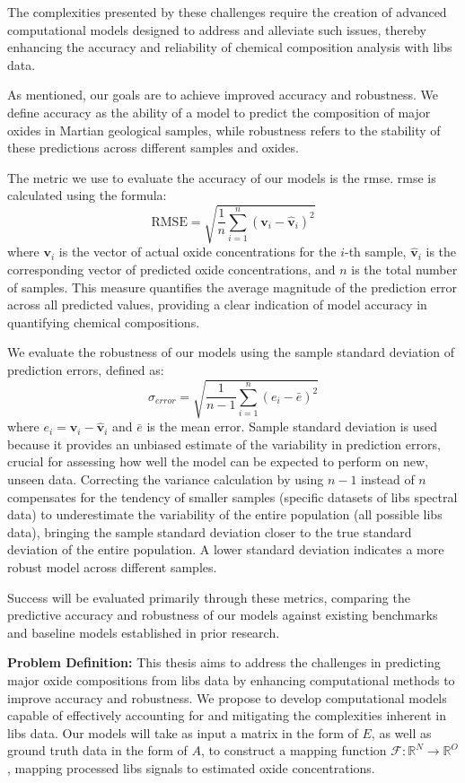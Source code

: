 The complexities presented by these challenges require the creation of advanced computational models designed to address and alleviate such issues, thereby enhancing the accuracy and reliability of chemical composition analysis with \gls{libs} data.

As mentioned, our goals are to achieve improved accuracy and robustness.
We define accuracy as the ability of a model to predict the composition of major oxides in Martian geological samples, while robustness refers to the stability of these predictions across different samples and oxides.

The metric we use to evaluate the accuracy of our models is the \gls{rmse}. \gls{rmse} is calculated using the formula:
\[
\text{RMSE} = \sqrt{\frac{1}{n} \sum_{i=1}^{n} (\mathbf{v}_i - \hat{\mathbf{v}}_i)^2}
\]
where \( \mathbf{v}_i \) is the vector of actual oxide concentrations for the \( i \)-th sample, \( \hat{\mathbf{v}}_i \) is the corresponding vector of predicted oxide concentrations, and \( n \) is the total number of samples. This measure quantifies the average magnitude of the prediction error across all predicted values, providing a clear indication of model accuracy in quantifying chemical compositions.

We evaluate the robustness of our models using the sample standard deviation of prediction errors, defined as:
\[
\sigma_{error} = \sqrt{\frac{1}{n-1} \sum_{i=1}^{n} (e_i - \bar{e})^2}
\]
where \( e_i = \mathbf{v}_i - \hat{\mathbf{v}}_i \) and \( \bar{e} \) is the mean error.
Sample standard deviation is used because it provides an unbiased estimate of the variability in prediction errors, crucial for assessing how well the model can be expected to perform on new, unseen data.
Correcting the variance calculation by using \( n-1 \) instead of \( n \) compensates for the tendency of smaller samples (specific datasets of \gls{libs} spectral data) to underestimate the variability of the entire population (all possible \gls{libs} data), bringing the sample standard deviation closer to the true standard deviation of the entire population.
A lower standard deviation indicates a more robust model across different samples.

Success will be evaluated primarily through these metrics, comparing the predictive accuracy and robustness of our models against existing benchmarks and baseline models established in prior research.

\textbf{Problem Definition:} This thesis aims to address the challenges in predicting major oxide compositions from \gls{libs} data by enhancing computational methods to improve accuracy and robustness. We propose to develop computational models capable of effectively accounting for and mitigating the complexities inherent in \gls{libs} data. Our models will take as input a matrix in the form of $E$, as well as ground truth data in the form of $A$, to construct a mapping function $\mathcal{F}: \mathbb{R}^N \rightarrow \mathbb{R}^O$, mapping processed \gls{libs} signals to estimated oxide concentrations.


